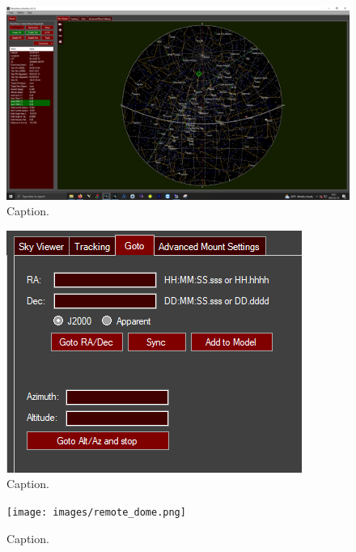 \documentclass{article}
\begin{document}
	\begin{figure}[htbp!]
		\centering
		\includegraphics[scale=0.25]{images/pwi4-3.png}
		\caption{Caption.}
		\label{fig:pwi4-3}
	\end{figure}
	
	\begin{figure}[htbp!]
		\centering
		\includegraphics[scale=0.75]{images/pwi4-4.png}
		\caption{Caption.}
		\label{fig:pwi4-4}
	\end{figure}

	\begin{figure}[htbp!]
		\centering
		\texttt{[image: images/remote\_dome.png]}
		\caption{Caption.}
		\label{fig:remote_dome}
	\end{figure}
	
\end{document}

